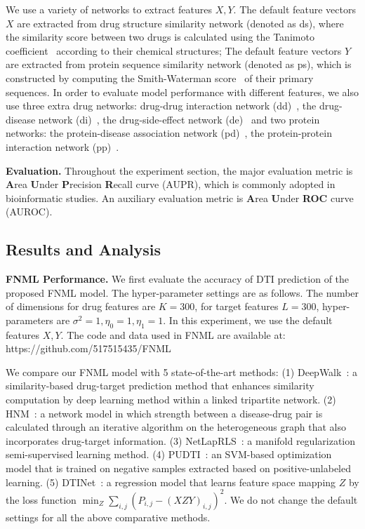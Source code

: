 \documentclass[journal]{IEEEtran}
\begin{document}
We use a variety of networks to extract features $X,Y$. The default feature vectors $X$ are extracted from drug structure similarity network (denoted as ds), where the similarity score between two drugs is calculated using the Tanimoto coefficient~\cite{Hattori2003Drug} according to their chemical structures; The default feature vectors $Y$ are extracted from protein sequence similarity network (denoted as ps), which is constructed by computing the Smith-Waterman score~\cite{Smith1981Protein} of their primary sequences. In order to evaluate model performance with different features, we also use three extra drug networks: drug-drug interaction network (dd)~\cite{Knox2011DrugBank}, the drug-disease network (di)~\cite{Davis2012DrugDisease}, the drug-side-effect network (de)~\cite{Kuhn2010DrugSideEffect} and two protein networks: the protein-disease association network (pd)~\cite{Davis2012DrugDisease}, the protein-protein interaction network (pp)~\cite{Keshava2009ProteinInteration}. 



\textbf{Evaluation.} Throughout the experiment section, the major evaluation metric is \textbf{A}rea \textbf{U}nder \textbf{P}recision \textbf{R}ecall curve (AUPR), which is commonly adopted in bioinformatic studies. An auxiliary evaluation metric is \textbf{A}rea \textbf{U}nder \textbf{ROC} curve (AUROC).

\subsection{Results and Analysis}
\textbf{FNML Performance.} We first evaluate the accuracy of DTI prediction of the proposed FNML model. The hyper-parameter settings are as follows. The number of dimensions for drug features are $K=300$, for target features $L=300$, hyper-parameters are $\sigma^2=1,\eta_{0}=1,\eta_{1}=1$. In this experiment, we use the default features $X,Y$. The code and data used in FNML are available at: https://github.com/517515435/FNML



We compare our FNML model with 5 state-of-the-art methods: (1) DeepWalk~\cite{Zong2017Deep}: a similarity-based drug-target prediction method that enhances similarity computation by deep learning method within a linked tripartite network. (2) HNM~\cite{Wang2014Drug}: a network model in which strength between a disease-drug pair is calculated through an iterative algorithm on the heterogeneous graph that also incorporates drug-target information. (3) NetLapRLS~\cite{Xia2010Semi}: a manifold regularization semi-supervised learning method. (4) PUDTI~\cite{Peng2017Screening}: an SVM-based optimization model that is trained on negative samples extracted based on positive-unlabeled learning. (5) DTINet~\cite{Luo2017Network}: a regression model that learns feature space mapping $Z$ by the loss function  $\min_{Z} \sum_{i,j}(P_{i,j}-(XZY)_{i,j})^2$. We do not change the default settings for all the above comparative methods.
\end{document}
